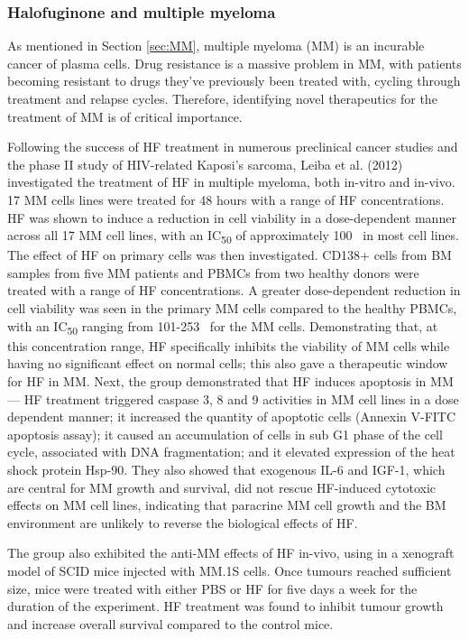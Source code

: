 \subsubsection{Halofuginone and multiple myeloma}\label{subsec:HF_MM}

As mentioned in Section \ref{sec:MM}, multiple myeloma (MM) is an incurable cancer of plasma cells.
Drug resistance is a massive problem in MM, with patients becoming resistant to drugs they've previously been treated with, cycling through treatment and relapse cycles.
Therefore, identifying novel therapeutics for the treatment of MM is of critical importance.

Following the success of HF treatment in numerous preclinical cancer studies and the phase II study of HIV-related Kaposi's sarcoma\cite{koon2011phase}, Leiba et al. (2012) investigated the treatment of HF in multiple myeloma, both in-vitro and in-vivo\cite{leiba2012halofuginone}.
17 MM cells lines were treated for 48 hours with a range of HF concentrations.
HF was shown to induce a reduction in cell viability in a dose-dependent manner across all 17 MM cell lines, with an IC\textsubscript{50} of approximately 100\si{\nano\Molar} in most cell lines.
The effect of HF on primary cells was then investigated.
CD138+ cells from BM samples from five MM patients and PBMCs from two healthy donors were treated with a range of HF concentrations.
A greater dose-dependent reduction in cell viability was seen in the primary MM cells compared to the healthy PBMCs, with an IC\textsubscript{50} ranging from 101-253\si{\nano\Molar} for the MM cells.
Demonstrating that, at this concentration range, HF specifically inhibits the viability of MM cells while having no significant effect on normal cells; this also gave a therapeutic window for HF in MM.
Next, the group demonstrated that HF induces apoptosis in MM--- HF treatment triggered caspase 3, 8 and 9 activities in MM cell lines in a dose dependent manner; it increased the quantity of apoptotic cells (Annexin V-FITC apoptosis assay); it caused an accumulation of cells in sub G1 phase of the cell cycle, associated with DNA fragmentation; and it elevated expression of the heat shock protein Hsp-90.
They also showed that exogenous IL-6 and IGF-1, which are central for MM growth and survival, did not rescue HF-induced cytotoxic effects on MM cell lines, indicating that paracrine MM cell growth and the BM environment are unlikely to reverse the biological effects of HF.

The group also exhibited the anti-MM effects of HF in-vivo, using in a xenograft model of SCID mice injected with MM.1S cells.
Once tumours reached sufficient size, mice were treated with either PBS or HF for five days a week for the duration of the experiment.
HF treatment was found to inhibit tumour growth and increase overall survival compared to the control mice.

